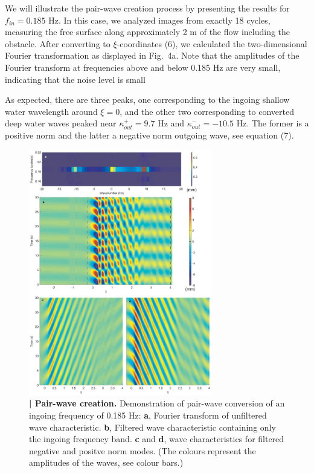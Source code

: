 \documentclass[12pt,aps%
]{revtex4}
\begin{document}
We will illustrate the pair-wave creation process by presenting the results
for $f_{in} = 0.185$ Hz. In this case, we analyzed images from exactly 18 cycles,
measuring the free surface along approximately 2 m of the flow including the
obstacle. After converting to $\xi$-coordinates (6), we calculated the
two-dimensional Fourier transformation as displayed in Fig.\ 4a. Note that the
amplitudes of the Fourier transform at frequencies above and below 0.185 Hz
are very small, indicating that the noise level is small


As expected, there are three peaks, one corresponding to the ingoing shallow
water wavelength around $\xi = 0$, and the other two corresponding to converted
deep water waves peaked near $\kappa^+_{out} = 9.7$ Hz and $\kappa^-_{out} =
-10.5$ Hz. The former
is a positive norm and the latter a negative norm outgoing wave, see equation
(7). 

\begin{figure}
\begin{center}
\includegraphics[width=80mm]{waterfall-4.eps}
\caption{{\bf  | Pair-wave creation.} Demonstration of pair-wave conversion
of an ingoing frequency of 0.185 Hz: {\bf a}, Fourier transform of unfiltered wave
characteristic. {\bf b}, Filtered wave characteristic containing only the ingoing
frequency band. {\bf c} and {\bf d}, wave characteristics for filtered negative and
positve norm modes. (The colours represent the amplitudes of the waves, see
colour bars.)
}
\end{center}
\end{figure}
\end{document}
